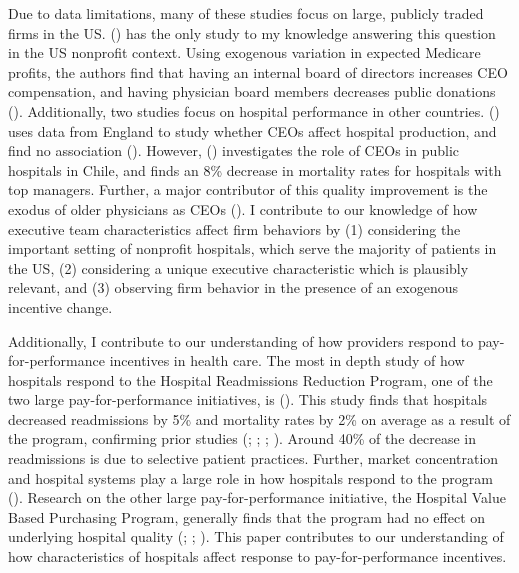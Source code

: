 \documentclass[12pt]{article}
\begin{document}
    Due to data limitations, many of these studies focus on large, publicly traded firms in the US. \citeauthor{brickley2010board} (\citeyear{brickley2010board}) has the only study to my knowledge answering this question in the US nonprofit context. Using exogenous variation in expected Medicare profits, the authors find that having an internal board of directors increases CEO compensation, and having physician board members decreases public donations (\cite{brickley2010board}). Additionally, two studies focus on hospital performance in other countries. \citeauthor{janke2019impact} (\citeyear{janke2019impact}) uses data from England to study whether CEOs affect hospital production, and find no association (\cite{janke2019impact}). However, \citeauthor{otero2022managers} (\citeyear{otero2022managers}) investigates the role of CEOs in public hospitals in Chile, and finds an 8\% decrease in mortality rates for hospitals with top managers. Further, a major contributor of this quality improvement is the exodus of older physicians as CEOs (\cite{otero2022managers}). I contribute to our knowledge of how executive team characteristics affect firm behaviors by (1) considering the important setting of nonprofit hospitals, which serve the majority of patients in the US, (2) considering a unique executive characteristic which is plausibly relevant, and (3) observing firm behavior in the presence of an exogenous incentive change. 

    Additionally, I contribute to our understanding of how providers respond to pay-for-performance incentives in health care. The most in depth study of how hospitals respond to the Hospital Readmissions Reduction Program, one of the two large pay-for-performance initiatives, is \citeauthor{gupta2021impacts} (\citeyear{gupta2021impacts}). This study finds that hospitals decreased readmissions by 5\% and mortality rates by 2\% on average as a result of the program, confirming prior studies (\cite{mellor2017does}; \cite{ziedan2018essays}; \cite{ody2019decreases}; \cite{gupta2021impacts}). Around 40\% of the decrease in readmissions is due to selective patient practices. Further, market concentration and hospital systems play a large role in how hospitals respond to the program (\cite{kunz2024assessing}). Research on the other large pay-for-performance initiative, the Hospital Value Based Purchasing Program, generally finds that the program had no effect on underlying hospital quality (\cite{us2015hospital}; \cite{norton2018moneyball}; \cite{friedson2019so}). This paper contributes to our understanding of how characteristics of hospitals affect response to pay-for-performance incentives.
\end{document}
